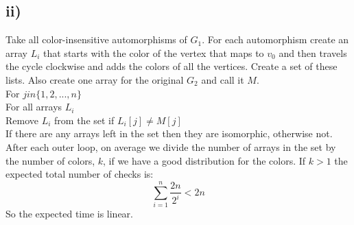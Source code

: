\documentclass[a4paper]{article}
\begin{document}
\subsection*{ii)}
Take all color-insensitive automorphisms of $G_1$. For each automorphism create an array $L_i$ that starts with the color of the vertex that maps to $v_0$ and then travels the cycle clockwise and adds the colors of all the vertices.  Create a set of these lists. Also create one array for the original $G_2$ and call it $M$.\\
For $j in \{1,2,...,n\}$ \\
\indent For all arrays $L_i$\\
\indent \indent Remove $L_i$ from the set if $L_i[j] \neq M[j]$\\
If there are any arrays left in the set then they are isomorphic, otherwise not.\\
After each outer loop, on average we divide the number of arrays in the set by the number of colors, $k$, if we have a good distribution for the colors. If $k>1$ the expected total number of checks is:
\[
\sum_{i=1}^{n}\frac{2n}{2^i}<2n
\]
So the expected time is linear.
\end{document}
